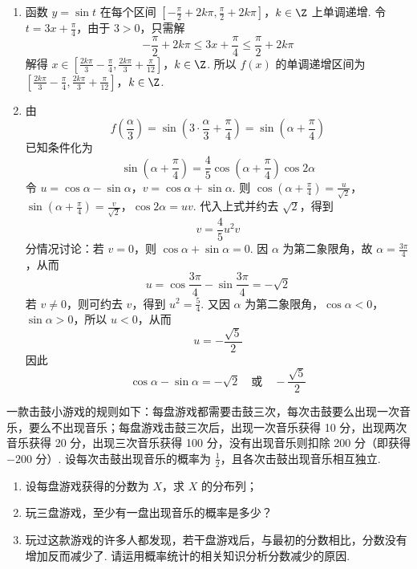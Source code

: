 \begin{solution}
\begin{enumerate}
\item 函数 \(y=\sin t\) 在每个区间
\(\left[-\frac\pi2+2k\pi,\frac\pi2+2k\pi\right]\)，\(k\in\Z\)
上单调递增. 令 \(t=3x+\frac\pi4\)，由于 \(3>0\)，只需解
\[
-\frac\pi2+2k\pi\leqslant3x+\frac\pi4\leqslant\frac\pi2+2k\pi
\]
解得
\(x\in\left[\frac{2k\pi}{3}-\frac\pi4,\frac{2k\pi}{3}+\frac\pi{12}\right]\)，\(k\in\Z\).
所以 \(f(x)\) 的单调递增区间为
\(\left[\frac{2k\pi}{3}-\frac\pi4,\frac{2k\pi}{3}+\frac\pi{12}\right]\)，\(k\in\Z\).

\item 由
\[
f\left(\frac\alpha3\right)=\sin\left(3\cdot\frac\alpha3+\frac\pi4\right)
=\sin\left(\alpha+\frac\pi4\right)
\]
已知条件化为
\[
\sin\left(\alpha+\frac\pi4\right)=\frac45\cos\left(\alpha+\frac\pi4\right)\cos2\alpha
\]
令
\(u=\cos\alpha-\sin\alpha\)，\(v=\cos\alpha+\sin\alpha\).
则
\(\cos\left(\alpha+\frac\pi4\right)=\frac{u}{\sqrt2}\)，\(\sin\left(\alpha+\frac\pi4\right)=\frac{v}{\sqrt2}\)，\(\cos2\alpha=uv\).
代入上式并约去 \(\sqrt2\)，得到
\[
v=\frac45u^2v
\]
分情况讨论：若 \(v=0\)，则 \(\cos\alpha+\sin\alpha=0\). 因 \(\alpha\) 为第二象限角，故 \(\alpha=\frac{3\pi}{4}\)，从而
\[
u=\cos\frac{3\pi}{4}-\sin\frac{3\pi}{4}=-\sqrt2
\]
若 \(v\ne0\)，则可约去 \(v\)，得到 \(u^2=\frac54\). 又因 \(\alpha\) 为第二象限角，\(\cos\alpha<0\)，\(\sin\alpha>0\)，所以 \(u<0\)，从而
\[
u=-\frac{\sqrt5}{2}
\]
因此
\[
\cos\alpha-\sin\alpha=-\sqrt2\quad\text{或}\quad-\frac{\sqrt5}{2}
\]
\end{enumerate}
\end{solution}

\begin{problem}
一款击鼓小游戏的规则如下：每盘游戏都需要击鼓三次，每次击鼓要么出现一次音乐，要么不出现音乐；每盘游戏击鼓三次后，出现一次音乐获得 10 分，出现两次音乐获得 20 分，出现三次音乐获得 100 分，没有出现音乐则扣除 200 分（即获得 \(-200\) 分）. 设每次击鼓出现音乐的概率为 \(\frac{1}{2}\)，且各次击鼓出现音乐相互独立.
\begin{enumerate}
\item 设每盘游戏获得的分数为 \(X\)，求 \(X\) 的分布列；
\item 玩三盘游戏，至少有一盘出现音乐的概率是多少？
\item 玩过这款游戏的许多人都发现，若干盘游戏后，与最初的分数相比，分数没有增加反而减少了. 请运用概率统计的相关知识分析分数减少的原因.
\end{enumerate}
\end{problem}

